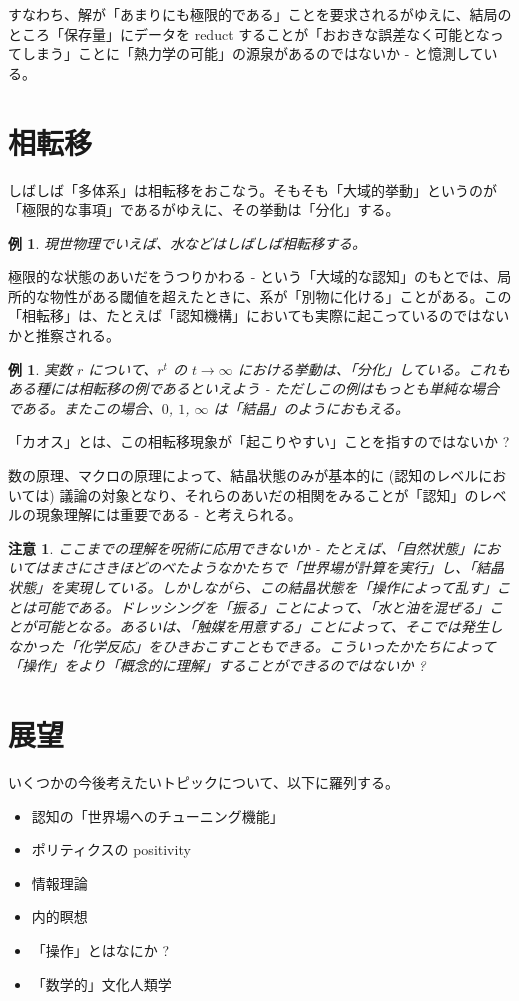 \documentclass{jsarticle}
\theoremstyle{break}
\newtheorem{note}[thm]{注意}
\newtheorem{ex}[thm]{例}
\begin{document}
すなわち、解が「あまりにも極限的である」ことを要求されるがゆえに、結局のところ「保存量」にデータを reduct することが「おおきな誤差なく可能となってしまう」ことに「熱力学の可能」の源泉があるのではないか - と憶測している。

\section{相転移}

しばしば「多体系」は相転移をおこなう。そもそも「大域的挙動」というのが「極限的な事項」であるがゆえに、その挙動は「分化」する。

\begin{ex}
現世物理でいえば、水などはしばしば相転移する。
\end{ex}

極限的な状態のあいだをうつりかわる - という「大域的な認知」のもとでは、局所的な物性がある閾値を超えたときに、系が「別物に化ける」ことがある。この「相転移」は、たとえば「認知機構」においても実際に起こっているのではないかと推察される。

\begin{ex}
実数 $r$ について、$r^t$ の $t \to \infty$ における挙動は、「分化」している。これもある種には相転移の例であるといえよう - ただしこの例はもっとも単純な場合である。またこの場合、$0$, $1$, $\infty$ は「結晶」のようにおもえる。
\end{ex}

「カオス」とは、この相転移現象が「起こりやすい」ことを指すのではないか ?

数の原理、マクロの原理によって、結晶状態のみが基本的に (認知のレベルにおいては) 議論の対象となり、それらのあいだの相関をみることが「認知」のレベルの現象理解には重要である - と考えられる。

\begin{note}
ここまでの理解を呪術に応用できないか - たとえば、「自然状態」においてはまさにさきほどのべたようなかたちで「世界場が計算を実行」し、「結晶状態」を実現している。しかしながら、この結晶状態を「操作によって乱す」ことは可能である。ドレッシングを「振る」ことによって、「水と油を混ぜる」ことが可能となる。あるいは、「触媒を用意する」ことによって、そこでは発生しなかった「化学反応」をひきおこすこともできる。こういったかたちによって「操作」をより「概念的に理解」することができるのではないか ?
\end{note}

\section{展望}

いくつかの今後考えたいトピックについて、以下に羅列する。

\begin{itemize}
\item 認知の「世界場へのチューニング機能」
\item ポリティクスの positivity
\item 情報理論
\item 内的瞑想
\item 「操作」とはなにか ?
\item 「数学的」文化人類学
\end{itemize}
\end{document}
